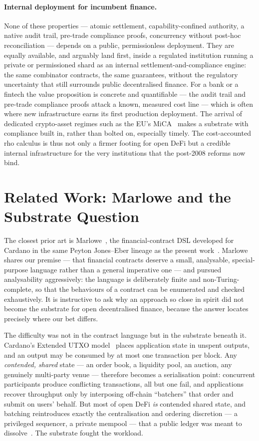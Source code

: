 \documentclass[11pt]{article}
\theoremstyle{definition}
\theoremstyle{plain}
\begin{document}
\paragraph{Internal deployment for incumbent finance.} None of these properties --- atomic settlement,
capability-confined authority, a native audit trail, pre-trade compliance proofs, concurrency without
post-hoc reconciliation --- depends on a public, permissionless deployment. They are equally available,
and arguably land first, inside a regulated institution running a private or permissioned shard as an
internal settlement-and-compliance engine: the same combinator contracts, the same guarantees, without
the regulatory uncertainty that still surrounds public decentralised finance. For a bank or a fintech
the value proposition is concrete and quantifiable --- the audit trail and pre-trade compliance proofs
attack a known, measured cost line --- which is often where new infrastructure earns its first
production deployment. The arrival of dedicated crypto-asset regimes such as the EU's
MiCA~\cite{MiCA2023} makes a substrate with compliance built in, rather than bolted on, especially
timely. The cost-accounted rho calculus is thus not only a firmer footing for open DeFi but a credible
internal infrastructure for the very institutions that the post-2008 reforms now bind.

\section{Related Work: Marlowe and the Substrate Question}\label{sec:related}

The closest prior art is Marlowe~\cite{LamelaThompson2018}, the financial-contract DSL developed for
Cardano in the same Peyton Jones--Eber lineage as the present work~\cite{SPJ2000}. Marlowe shares our
premise --- that financial contracts deserve a small, analysable, special-purpose language rather than
a general imperative one --- and pursued analysability aggressively: the language is deliberately
finite and non-Turing-complete, so that the behaviours of a contract can be enumerated and checked
exhaustively. It is instructive to ask why an approach so close in spirit did not become the substrate
for open decentralised finance, because the answer locates precisely where our bet differs.

The difficulty was not in the contract language but in the substrate beneath it. Cardano's Extended
UTXO model~\cite{EUTXO2020} places application state in unspent outputs, and an output may be consumed
by at most one transaction per block. Any \emph{contended, shared} state --- an order book, a
liquidity pool, an auction, any genuinely multi-party venue --- therefore becomes a serialisation
point: concurrent participants produce conflicting transactions, all but one fail, and applications
recover throughput only by interposing off-chain ``batchers'' that order and submit on users' behalf.
But most of open DeFi \emph{is} contended shared state, and batching reintroduces exactly the
centralisation and ordering discretion --- a privileged sequencer, a private mempool --- that a public
ledger was meant to dissolve~\cite{Daian2020}. The substrate fought the workload.
\end{document}
